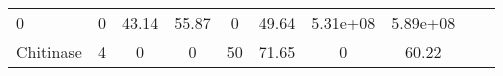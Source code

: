 \documentclass[]{article}
\begin{document}
\begin{longtable}[]{@{}lccccccccc@{}}
\begin{minipage}[t]{0.08\columnwidth}
0\strut
\end{minipage} & \begin{minipage}[t]{0.08\columnwidth}\centering\strut
0\strut
\end{minipage} & \begin{minipage}[t]{0.08\columnwidth}\centering\strut
43.14\strut
\end{minipage} & \begin{minipage}[t]{0.08\columnwidth}\centering\strut
55.87\strut
\end{minipage} & \begin{minipage}[t]{0.08\columnwidth}\centering\strut
0\strut
\end{minipage} & \begin{minipage}[t]{0.08\columnwidth}\centering\strut
49.64\strut
\end{minipage} & \begin{minipage}[t]{0.08\columnwidth}\centering\strut
5.31e+08\strut
\end{minipage} & \begin{minipage}[t]{0.08\columnwidth}\centering\strut
5.89e+08\strut
\end{minipage}\tabularnewline
\begin{minipage}[t]{0.07\columnwidth}\raggedright\strut
Chitinase\strut
\end{minipage} & \begin{minipage}[t]{0.06\columnwidth}\centering\strut
4\strut
\end{minipage} & \begin{minipage}[t]{0.08\columnwidth}\centering\strut
0\strut
\end{minipage} & \begin{minipage}[t]{0.08\columnwidth}\centering\strut
0\strut
\end{minipage} & \begin{minipage}[t]{0.08\columnwidth}\centering\strut
50\strut
\end{minipage} & \begin{minipage}[t]{0.08\columnwidth}\centering\strut
71.65\strut
\end{minipage} & \begin{minipage}[t]{0.08\columnwidth}\centering\strut
0\strut
\end{minipage} & \begin{minipage}[t]{0.08\columnwidth}\centering\strut
60.22\strut
\end{minipage} & \begin{minipage}[t]{0.08\columnwidth}\centering\strut

\end{minipage}
\end{longtable}
\end{document}
